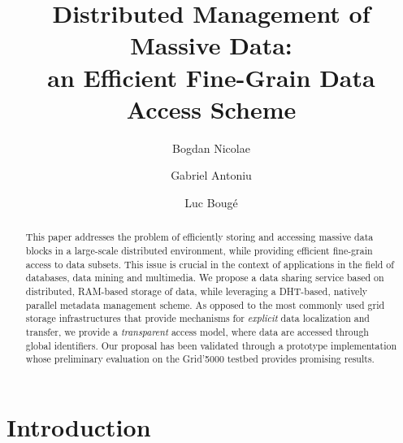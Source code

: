 \documentclass{llncs}
\begin{document}
\title{Distributed Management of Massive Data:\\
  an Efficient Fine-Grain Data Access Scheme}



\author{Bogdan Nicolae\and Gabriel Antoniu\and Luc Boug\'e}





\maketitle

\begin{abstract}
  This paper addresses the problem of efficiently storing and
  accessing massive data blocks in a large-scale distributed
  environment, while providing efficient fine-grain access to data
  subsets. This issue is crucial in the context of applications in the
  field of databases, data mining and multimedia.  We propose a data
  sharing service based on distributed, RAM-based storage of data,
  while leveraging a DHT-based, natively parallel metadata
  management scheme. As opposed to the most commonly used grid storage
  infrastructures that provide mechanisms for \emph{explicit} data
  localization and transfer, we provide a \emph{transparent} access
  model, where data are accessed through global identifiers. Our
  proposal has been validated through a prototype implementation whose
  preliminary evaluation on the Grid'5000 testbed provides promising
  results.
\end{abstract}



\section{Introduction}
\label{sec:intro}
\end{document}
